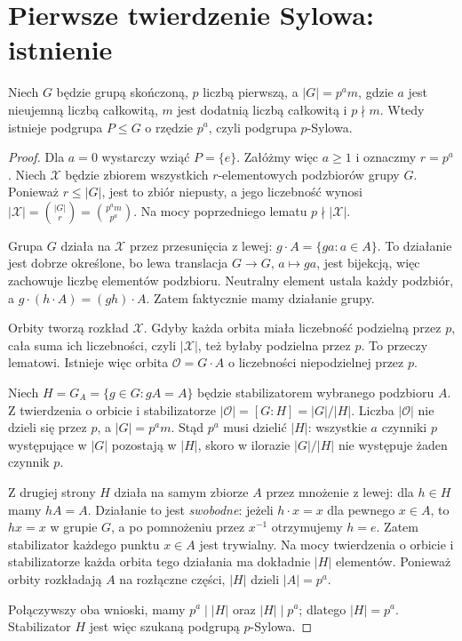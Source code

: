 \section{Pierwsze twierdzenie Sylowa: istnienie}
\begin{twierdzenie}
\label{aa:tw:sylow1}
Niech $G$ będzie grupą skończoną, $p$ liczbą pierwszą,
a $|G|=p^a m$, gdzie $a$ jest nieujemną liczbą całkowitą,
$m$ jest dodatnią liczbą całkowitą i $p\nmid m$.
Wtedy istnieje podgrupa $P\le G$ o rzędzie $p^a$,
czyli podgrupa $p$-Sylowa.
\end{twierdzenie}
\begin{proof}
Dla $a=0$ wystarczy wziąć $P=\{e\}$.
Załóżmy więc $a\ge1$ i oznaczmy $r=p^a$.
Niech $\mathcal X$ będzie zbiorem wszystkich $r$-elementowych
podzbiorów grupy $G$. Ponieważ $r\le|G|$, jest to zbiór niepusty,
a jego liczebność wynosi
$|\mathcal X|=\binom{|G|}{r}=\binom{p^a m}{p^a}$.
Na mocy poprzedniego lematu $p\nmid|\mathcal X|$.

Grupa $G$ działa na $\mathcal X$ przez przesunięcia z lewej:
$g\cdot A=\{ga:a\in A\}$.
To działanie jest dobrze określone, bo lewa translacja
$G\to G$, $a\mapsto ga$, jest bijekcją, więc zachowuje
liczbę elementów podzbioru.
Neutralny element ustala każdy podzbiór,
a $g\cdot(h\cdot A)=(gh)\cdot A$.
Zatem faktycznie mamy działanie grupy.

Orbity tworzą rozkład $\mathcal X$.
Gdyby każda orbita miała liczebność podzielną przez $p$,
cała suma ich liczebności, czyli $|\mathcal X|$,
też byłaby podzielna przez $p$. To przeczy lematowi.
Istnieje więc orbita $\mathcal O=G\cdot A$
o liczebności niepodzielnej przez $p$.

Niech $H=G_A=\{g\in G:gA=A\}$ będzie stabilizatorem
wybranego podzbioru $A$.
Z twierdzenia o orbicie i stabilizatorze
$|\mathcal O|=[G:H]=|G|/|H|$.
Liczba $|\mathcal O|$ nie dzieli się przez $p$, a
$|G|=p^a m$. Stąd $p^a$ musi dzielić $|H|$:
wszystkie $a$ czynniki $p$ występujące w $|G|$
pozostają w $|H|$, skoro w ilorazie $|G|/|H|$
nie występuje żaden czynnik $p$.

Z drugiej strony $H$ działa na samym zbiorze $A$ przez
mnożenie z lewej: dla $h\in H$ mamy $hA=A$.
Działanie to jest \emph{swobodne}: jeżeli $h\cdot x=x$
dla pewnego $x\in A$, to $hx=x$ w grupie $G$,
a po pomnożeniu przez $x^{-1}$ otrzymujemy $h=e$.
Zatem stabilizator każdego punktu $x\in A$ jest trywialny.
Na mocy twierdzenia o orbicie i stabilizatorze
każda orbita tego działania ma dokładnie $|H|$ elementów.
Ponieważ orbity rozkładają $A$ na rozłączne części,
$|H|$ dzieli $|A|=p^a$.

Połączywszy oba wnioski, mamy $p^a\mid|H|$ oraz
$|H|\mid p^a$; dlatego $|H|=p^a$.
Stabilizator $H$ jest więc szukaną podgrupą $p$-Sylowa.
\end{proof}

